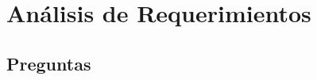 \documentclass[11pt,letterpaper,spanish]{article}
\begin{document}
\section*{Análisis de Requerimientos}

\begin{enumerate}[label=\alph*., leftmargin=*]
	
	
	
        
\end{enumerate}

\subsection*{Preguntas}

\begin{enumerate}[label=\alph*., leftmargin=*]
  
  
\end{enumerate}


\printbibliography
\end{document}
